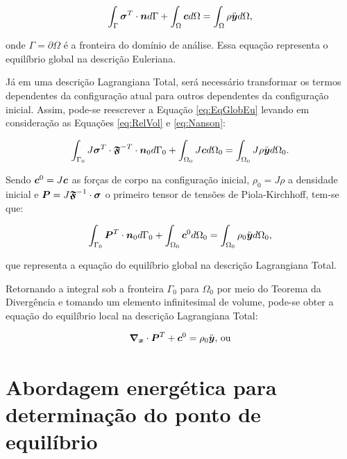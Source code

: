 \begin{equation}
    \int_\Gamma{\boldsymbol{\sigma}^T\cdot\boldsymbol{n}d\Gamma}+\int_\Omega{\boldsymbol{c}d\Omega}=\int_\Omega{\rho\ddot{\boldsymbol{y}}d\Omega}
    \text{,}
    \label{eq:EqGlobEu}
\end{equation}

\noindent onde $\Gamma=\partial\Omega$ é a fronteira do domínio de análise. Essa equação representa o equilíbrio global na descrição Euleriana.

Já em uma descrição Lagrangiana Total, será necessário transformar os termos dependentes da configuração atual para outros dependentes da configuração inicial. Assim, pode-se reescrever a Equação \eqref{eq:EqGlobEu} levando em consideração as Equações \eqref{eq:RelVol} e \eqref{eq:Nanson}:

\begin{equation}
    \int_{\Gamma_0}{J\boldsymbol{\sigma}^T\cdot\boldsymbol{\mathfrak{F}}^{-T}\cdot\boldsymbol{n}_0d\Gamma_0}+\int_{\Omega_0}{J\boldsymbol{c}d\Omega_0}=\int_{\Omega_0}{J\rho\ddot{\boldsymbol{y}}d\Omega_0}
    \text{.}
\end{equation}

\noindent Sendo $\boldsymbol{c}^0=J\boldsymbol{c}$ as forças de corpo na configuração inicial, $\rho_0=J\rho$ a densidade inicial e $\boldsymbol{P}=J\boldsymbol{\mathfrak{F}}^{-1}\cdot\boldsymbol{\sigma}$ o primeiro tensor de tensões de Piola-Kirchhoff, tem-se que:

\begin{equation}
    \int_{\Gamma_0}{\boldsymbol{P}^T\cdot\boldsymbol{n}_0d\Gamma_0}+\int_{\Omega_0}{\boldsymbol{c}^0d\Omega_0}=\int_{\Omega_0}{\rho_0\ddot{\boldsymbol{y}}d\Omega_0}\text{,}
\end{equation}

\noindent que representa a equação do equilíbrio global na descrição Lagrangiana Total.

Retornando a integral sob a fronteira $\Gamma_0$ para $\Omega_0$ por meio do Teorema da Divergência e tomando um elemento infinitesimal de volume, pode-se obter a equação do equilíbrio local na descrição Lagrangiana Total:

\begin{equation}
    \boldsymbol{\nabla_x}\cdot\boldsymbol{P}^T+\boldsymbol{c}^0=\rho_0\ddot{\boldsymbol{y}}\text{, ou}
\end{equation}

\section{Abordagem energética para determinação do ponto de equilíbrio}

